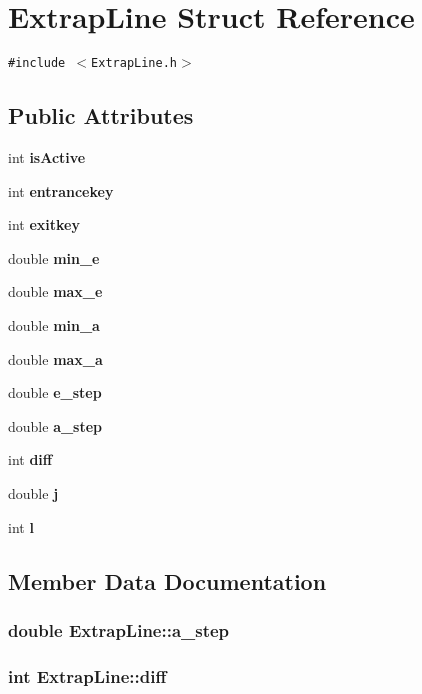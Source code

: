 \section{Extrap\-Line Struct Reference}
\label{structExtrapLine}
{\tt \#include $<$Extrap\-Line.h$>$}

\subsection*{Public Attributes}
\begin{CompactItemize}
\item 
int \bf{is\-Active}
\item 
int \bf{entrancekey}
\item 
int \bf{exitkey}
\item 
double \bf{min\_\-e}
\item 
double \bf{max\_\-e}
\item 
double \bf{min\_\-a}
\item 
double \bf{max\_\-a}
\item 
double \bf{e\_\-step}
\item 
double \bf{a\_\-step}
\item 
int \bf{diff}
\item 
double \bf{j}
\item 
int \bf{l}
\end{CompactItemize}


\subsection{Member Data Documentation}
\subsubsection{\setlength{\rightskip}{0pt plus 5cm}double \bf{Extrap\-Line::a\_\-step}}\label{structExtrapLine_daf6332ea8b57be8e2bbdf453a17936e}


\subsubsection{\setlength{\rightskip}{0pt plus 5cm}int \bf{Extrap\-Line::diff}}\label{structExtrapLine_97e7e0ce1343d6af9dc6e8a27b7ebfa2}


